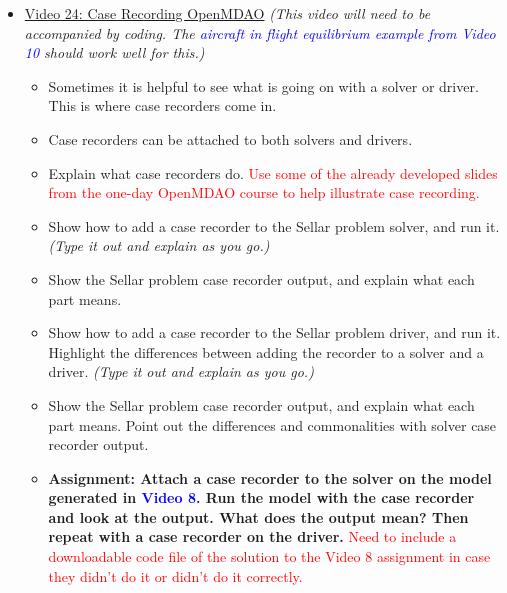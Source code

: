 \documentclass[12pt, letterpaper]{article}
\begin{document}
\begin{itemize}
	\item \underline{Video 24: Case Recording OpenMDAO} \textit{(This video will need to be accompanied by coding. The \textcolor{blue}{aircraft in flight equilibrium example from Video 10} should work well for this.)}
		\begin{itemize}
			\item Sometimes it is helpful to see what is going on with a solver or driver. This is where case recorders come in.
			\item Case recorders can be attached to both solvers and drivers.
			\item Explain what case recorders do. \textcolor{red}{Use some of the already developed slides from the one-day OpenMDAO course to help illustrate case recording.}
			\item Show how to add a case recorder to the Sellar problem solver, and run it. \textit{(Type it out and explain as you go.)}
			\item Show the Sellar problem case recorder output, and explain what each part means.
			\item Show how to add a case recorder to the Sellar problem driver, and run it. Highlight the differences between adding the recorder to a solver and a driver. \textit{(Type it out and explain as you go.)}
			\item Show the Sellar problem case recorder output, and explain what each part means. Point out the differences and commonalities with solver case recorder output.
			\item \textbf{Assignment: Attach a case recorder to the solver on the model generated in \textcolor{blue}{Video 8}. Run the model with the case recorder and look at the output. What does the output mean? Then repeat with a case recorder on the driver.} \textcolor{red}{Need to include a downloadable code file of the solution to the Video 8 assignment in case they didn't do it or didn't do it correctly.}
		\end{itemize}
		

\end{itemize}
\end{document}

